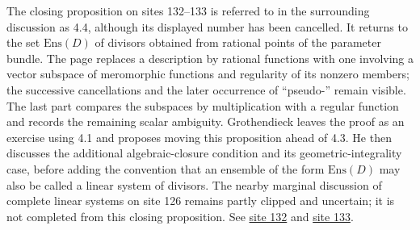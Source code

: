 The closing proposition on sites 132--133 is referred to in the surrounding discussion as 4.4, although its displayed number has been cancelled. It returns to the set \(\mathrm{Ens}(D)\) of divisors obtained from rational points of the parameter bundle. The page replaces a description by rational functions with one involving a vector subspace of meromorphic functions and regularity of its nonzero members; the successive cancellations and the later occurrence of ``pseudo-'' remain visible. The last part compares the subspaces by multiplication with a regular function and records the remaining scalar ambiguity. Grothendieck leaves the proof as an exercise using 4.1 and proposes moving this proposition ahead of 4.3. He then discusses the additional algebraic-closure condition and its geometric-integrality case, before adding the convention that an ensemble of the form \(\mathrm{Ens}(D)\) may also be called a linear system of divisors. The nearby marginal discussion of complete linear systems on site 126 remains partly clipped and uncertain; it is not completed from this closing proposition. See \href{https://grothendieck.umontpellier.fr/web/viewer.html?file=../25.pdf#page=133}{site 132} and \href{https://grothendieck.umontpellier.fr/web/viewer.html?file=../25.pdf#page=134}{site 133}.
